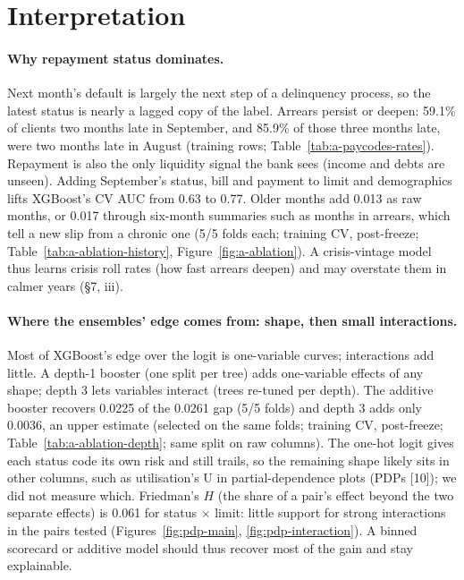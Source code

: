 \section{Interpretation}

\paragraph{Why repayment status dominates.}
Next month's default is largely the next step of a delinquency process, so the latest status is nearly a lagged copy of the label. Arrears persist or deepen: 59.1\% of clients two months late in September, and 85.9\% of those three months late, were two months late in August (training rows; Table~\ref{tab:a-paycodes-rates}). Repayment is also the only liquidity signal the bank sees (income and debts are unseen). Adding September's status, bill and payment to limit and demographics lifts XGBoost's CV AUC from 0.63 to 0.77. Older months add 0.013 as raw months, or 0.017 through six-month summaries such as months in arrears, which tell a new slip from a chronic one (5/5 folds each; training CV, post-freeze; Table~\ref{tab:a-ablation-history}, Figure~\ref{fig:a-ablation}). A crisis-vintage model thus learns crisis roll rates (how fast arrears deepen) and may overstate them in calmer years (\S7, iii).

\paragraph{Where the ensembles' edge comes from: shape, then small interactions.}
Most of XGBoost's edge over the logit is one-variable curves; interactions add little. A depth-1 booster (one split per tree) adds one-variable effects of any shape; depth 3 lets variables interact (trees re-tuned per depth). The additive booster recovers 0.0225 of the 0.0261 gap (5/5 folds) and depth 3 adds only 0.0036, an upper estimate (selected on the same folds; training CV, post-freeze; Table~\ref{tab:a-ablation-depth}; same split on raw columns). The one-hot logit gives each status code its own risk and still trails, so the remaining shape likely sits in other columns, such as utilisation's U in partial-dependence plots (PDPs [10]); we did not measure which. Friedman's $H$ (the share of a pair's effect beyond the two separate effects) is 0.061 for status $\times$ limit: little support for strong interactions in the pairs tested (Figures~\ref{fig:pdp-main}, \ref{fig:pdp-interaction}). A binned scorecard or additive model should thus recover most of the gain and stay explainable.

